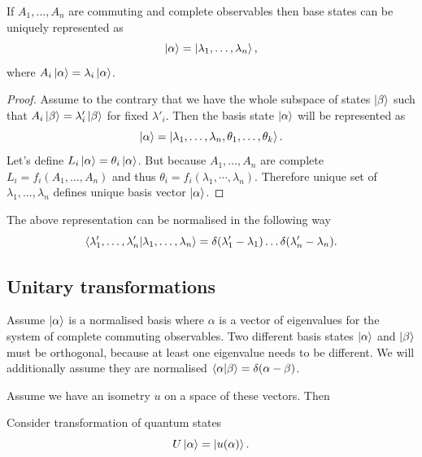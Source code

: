 \documentclass[main.tex]{subfiles}
\begin{document}
\begin{fact}
If $A_1, \dots, A_n$ are commuting and complete observables then base states can be uniquely represented as 
\begin{equation}
\ket{\alpha} = \ket{\lambda_1, \dots, \lambda_n},
\end{equation}
where $A_i \ket{\alpha} = \lambda_i \ket{\alpha}$.  
\end{fact}
\begin{proof}
Assume to the contrary that we have the whole subspace of states $\ket{\beta}$ such that $A_i \ket{\beta} = \lambda'_i \ket{\beta}$ for fixed $\lambda'_i$. Then the basis state $\ket{\alpha}$ will be represented as
\begin{equation}
 \ket{\alpha} = \ket{\lambda_1, \dots, \lambda_n, \theta_1, \dots, \theta_k}.
\end{equation}
Let's define $L_i\ket{\alpha} = \theta_i \ket{\alpha}$. But because $A_1, \dots, A_n$ are complete $L_i = f_i(A_1, \dots, A_n)$ and thus $\theta_i = f_i(\lambda_1, \cdots, \lambda_n)$. Therefore unique set of  $\lambda_1, \dots, \lambda_n$ defines unique basis vector $\ket{\alpha}$.
\end{proof}

The above representation can be normalised in the following way
\begin{equation}
\bra{\lambda'_1, \dots, \lambda'_n}\ket{\lambda_1, \dots, \lambda_n} = \delta(\lambda'_1 - \lambda_1)\dots\delta(\lambda'_n - \lambda_n).
\end{equation}

\subsection{Unitary transformations}

Assume $\ket{\alpha}$ is a normalised basis where $\alpha$ is a vector of eigenvalues for the system of complete commuting observables. Two different basis states $\ket{\alpha}$ and $\ket{\beta}$ must be orthogonal, because at least one eigenvalue needs to be different. We will additionally assume they are normalised $\bra{\alpha}\ket{\beta}= \delta(\alpha - \beta)$. 

Assume we have an isometry $u$ on a space of these vectors. Then 

Consider transformation of quantum states
\begin{equation}
U \ket{\alpha} = \ket{u(\alpha)}.
\end{equation} 
\end{document}
